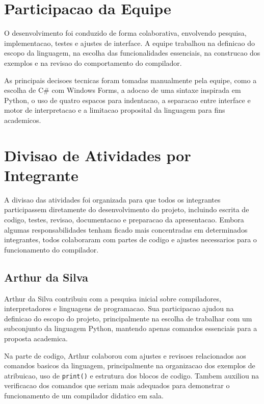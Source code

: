 \documentclass[12pt,a4paper]{article}
\begin{document}
\section{Participacao da Equipe}

O desenvolvimento foi conduzido de forma colaborativa, envolvendo pesquisa, implementacao, testes e ajustes de interface. A equipe trabalhou na definicao do escopo da linguagem, na escolha das funcionalidades essenciais, na construcao dos exemplos e na revisao do comportamento do compilador.

As principais decisoes tecnicas foram tomadas manualmente pela equipe, como a escolha de C\# com Windows Forms, a adocao de uma sintaxe inspirada em Python, o uso de quatro espacos para indentacao, a separacao entre interface e motor de interpretacao e a limitacao proposital da linguagem para fins academicos.

\section{Divisao de Atividades por Integrante}

A divisao das atividades foi organizada para que todos os integrantes participassem diretamente do desenvolvimento do projeto, incluindo escrita de codigo, testes, revisao, documentacao e preparacao da apresentacao. Embora algumas responsabilidades tenham ficado mais concentradas em determinados integrantes, todos colaboraram com partes de codigo e ajustes necessarios para o funcionamento do compilador.

\subsection*{Arthur da Silva}

Arthur da Silva contribuiu com a pesquisa inicial sobre compiladores, interpretadores e linguagens de programacao. Sua participacao ajudou na definicao do escopo do projeto, principalmente na escolha de trabalhar com um subconjunto da linguagem Python, mantendo apenas comandos essenciais para a proposta academica.

Na parte de codigo, Arthur colaborou com ajustes e revisoes relacionados aos comandos basicos da linguagem, principalmente na organizacao dos exemplos de atribuicao, uso de \texttt{print()} e estrutura dos blocos de codigo. Tambem auxiliou na verificacao dos comandos que seriam mais adequados para demonstrar o funcionamento de um compilador didatico em sala.
\end{document}
